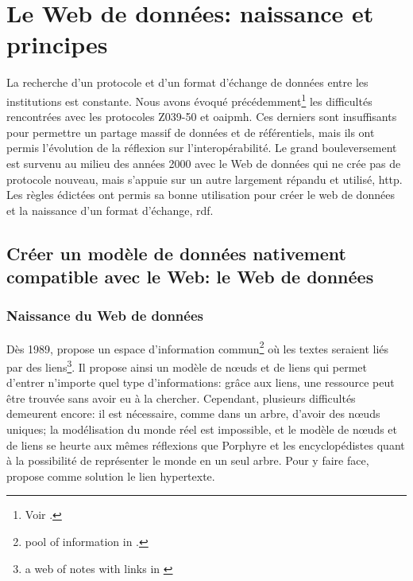 \section{\label{II-A-1}Le Web de données: naissance et principes}

La recherche d'un protocole et d'un format d'échange de données entre les institutions est constante. Nous avons évoqué précédemment\footnote{Voir .} les difficultés rencontrées avec les protocoles Z039-50 et \ac{oaipmh}. Ces derniers sont insuffisants pour permettre un partage massif de données et de référentiels, mais ils ont permis l'évolution de la réflexion sur l'interopérabilité. Le grand bouleversement est survenu au milieu des années 2000 avec le Web de données qui ne crée pas de protocole nouveau, mais s'appuie sur un autre largement répandu et utilisé, \ac{http}. Les règles édictées ont permis sa bonne utilisation pour créer le web de données et la naissance d'un format d'échange, \ac{rdf}.

\subsection{\label{II-A-1-a}Créer un modèle de données nativement compatible avec le Web: le Web de données}

\subsubsection{\label{II-A-1-a-i}Naissance du Web de données}

Dès 1989,  propose un \og espace d'information commun\fg{}\footnote{\og pool of information\fg{} in \cite{berners-lee_information_1989}.} où les textes seraient liés par des liens\footnote{\og a web of notes with links\fg{} in \cite{berners-lee_information_1989}}. Il propose ainsi un modèle de nœuds et de liens qui permet d'entrer n'importe quel type d'informations: grâce aux liens, une ressource peut être trouvée sans avoir eu à la chercher. Cependant, plusieurs difficultés demeurent encore: il est nécessaire, comme dans un arbre, d'avoir des nœuds uniques; la modélisation du monde réel est impossible, et le modèle de nœuds et de liens se heurte aux mêmes réflexions que Porphyre et les encyclopédistes quant à la possibilité de représenter le monde en un seul arbre. Pour y faire face,  propose comme solution le lien hypertexte.\\

